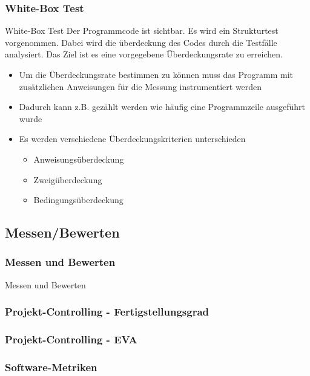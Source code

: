 \begin{frame}
\frametitle{White-Box Test}
	\begin{block}{White-Box Test}
		Der Programmcode ist sichtbar. Es wird ein Strukturtest vorgenommen. Dabei wird die
		überdeckung des Codes durch die Testfälle analysiert. Das Ziel ist es eine vorgegebene
		Überdeckungsrate zu erreichen.
	\end{block}
	\begin{itemize}
		\item Um die Überdeckungsrate bestimmen zu können muss das Programm mit zusätzlichen
					Anweisungen für die Messung instrumentiert werden
		\item Dadurch kann z.B. gezählt werden wie häufig eine Programmzeile ausgeführt wurde
		\item Es werden verschiedene Überdeckungskriterien unterschieden
					\begin{itemize}
						\item Anweisungsüberdeckung
						\item Zweigüberdeckung
						\item Bedingungsüberdeckung
					\end{itemize}
	\end{itemize}
\end{frame}

\subsection{Messen/Bewerten}
\begin{frame}
\frametitle{Messen und Bewerten}
\huge Messen und Bewerten
\end{frame}

\begin{frame}
\frametitle{Projekt-Controlling - Fertigstellungsgrad}

\end{frame}

\begin{frame}
\frametitle{Projekt-Controlling - EVA}

\end{frame}

\begin{frame}
\frametitle{Software-Metriken}

\end{frame}
